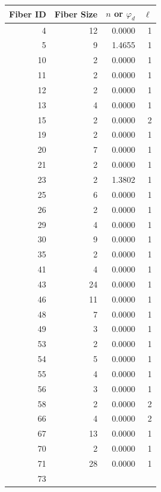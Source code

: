\documentclass[12pt]{diazessay} %
\begin{document}
\centering
\begin{table}[b]
	\centering
\begin{tabular}{r|r|r|r}
\hline
Fiber ID &  Fiber Size &  $n$ or $\varphi_d$ &  $\ell$ \\ \hline
4 &          12 &             0.0000 &          1 \\        5 &           9 &             1.4655 &          1 \\       10 &           2 &             0.0000 &          1 \\       11 &           2 &             0.0000 &          1 \\       12 &           2 &             0.0000 &          1 \\       13 &           4 &             0.0000 &          1 \\       15 &           2 &             0.0000 &          2 \\       19 &           2 &             0.0000 &          1 \\       20 &           7 &             0.0000 &          1 \\       21 &           2 &             0.0000 &          1 \\       23 &           2 &             1.3802 &          1 \\       25 &           6 &             0.0000 &          1 \\       26 &           2 &             0.0000 &          1 \\       29 &           4 &             0.0000 &          1 \\       30 &           9 &             0.0000 &          1 \\       35 &           2 &             0.0000 &          1 \\       41 &           4 &             0.0000 &          1 \\       43 &          24 &             0.0000 &          1 \\       46 &          11 &             0.0000 &          1 \\       48 &           7 &             0.0000 &          1 \\       49 &           3 &             0.0000 &          1 \\       53 &           2 &             0.0000 &          1 \\       54 &           5 &             0.0000 &          1 \\       55 &           4 &             0.0000 &          1 \\       56 &           3 &             0.0000 &          1 \\       58 &           2 &             0.0000 &          2 \\       66 &           4 &             0.0000 &          2 \\       67 &          13 &             0.0000 &          1 \\       70 &           2 &             0.0000 &          1 \\       71 &          28 &             0.0000 &          1 \\       73 &           
\end{tabular}
\end{table}
\end{document}
